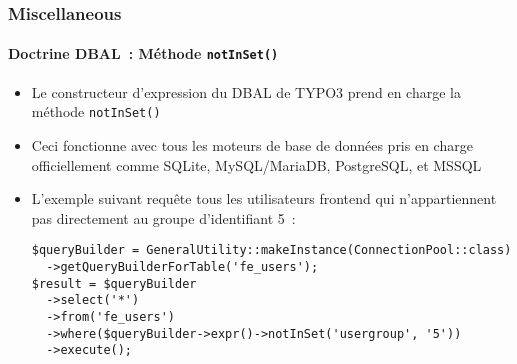 %

\begin{frame}[fragile]
	\frametitle{Miscellaneous}
	\framesubtitle{Doctrine DBAL~: Méthode \texttt{notInSet()}}


	\begin{itemize}
		\item Le constructeur d'expression du DBAL de TYPO3 prend en charge la méthode \texttt{notInSet()}
		\item Ceci fonctionne avec tous les moteurs de base de données pris en charge officiellement comme SQLite,
			MySQL/MariaDB, PostgreSQL, et MSSQL
		\item L'exemple suivant requête tous les utilisateurs frontend qui n'appartiennent pas directement
			au groupe d'identifiant 5~:
\begin{lstlisting}
$queryBuilder = GeneralUtility::makeInstance(ConnectionPool::class)
  ->getQueryBuilderForTable('fe_users');
$result = $queryBuilder
  ->select('*')
  ->from('fe_users')
  ->where($queryBuilder->expr()->notInSet('usergroup', '5'))
  ->execute();
\end{lstlisting}

	\end{itemize}

\end{frame}

